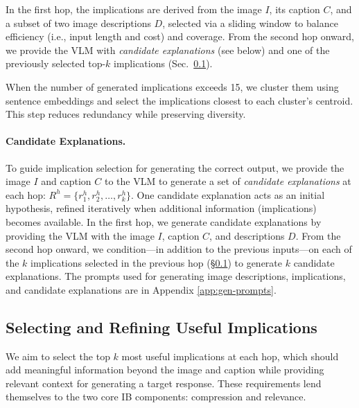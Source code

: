 In the first hop, the implications are derived from the image $I$, its caption $C$, and a subset of two image descriptions $D$, selected via a sliding window to balance efficiency (i.e., input length and cost) and coverage. 
From the second hop onward, we provide the VLM with \textit{candidate explanations} (see below) and one of the previously selected top-$k$ implications (Sec.~\ref{sec:method:refine-imps}). 

When the number of generated implications exceeds 15, we cluster them using sentence embeddings and select the implications closest to each cluster's centroid. This step reduces redundancy while preserving diversity.


\paragraph{Candidate Explanations.} To guide implication selection for generating the correct output, we provide the image $I$ and caption $C$ to the VLM to generate a set of \textit{candidate explanations} at each hop: $R^{h} = \{ r_1^{h}, r_2^{h}, \dots, r_k^{h} \}$. One candidate explanation acts as an initial hypothesis, refined iteratively when additional information (implications) becomes available.
In the first hop, we generate candidate explanations by providing the VLM with the image $I$, caption $C$, and descriptions $D$. From the second hop onward, we condition---in addition to the previous inputs---on each of the $k$ implications selected in the previous hop (\S\ref{sec:method:refine-imps}) to generate $k$ candidate explanations. 
The prompts used for generating image descriptions, implications, and candidate explanations are in Appendix \ref{app:gen-prompts}.

\subsection{Selecting and Refining Useful Implications}
\label{sec:method:refine-imps}

We aim to select the top $k$ most useful implications at each hop, which should add meaningful information beyond the image and caption while providing relevant context for generating a target response. These requirements lend themselves to the two core IB components: compression and relevance.

